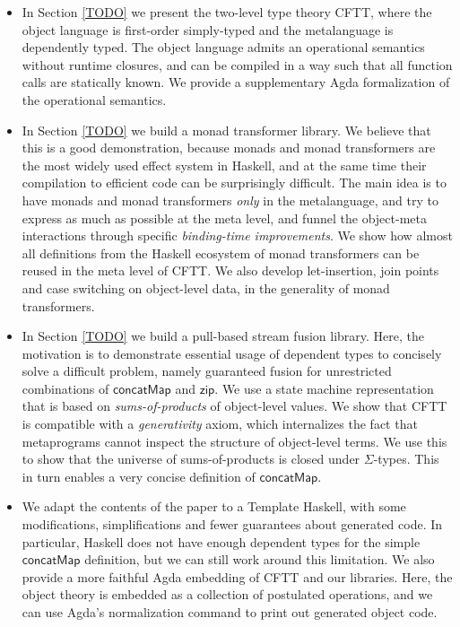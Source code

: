 \documentclass[acmsmall,screen,review,anonymous]{acmart}
\newcommand{\mit}[1]{{\mathsf{#1}}}
\newcommand{\msf}[1]{{\mathsf{#1}}}
\newcommand{\concatMap}{\msf{concatMap}}
\theoremstyle{remark}
\begin{document}
\begin{itemize}
\item In Section \ref{TODO} we present the two-level type theory CFTT, where the
  object language is first-order simply-typed and the metalanguage is
  dependently typed. The object language admits an operational semantics without
  runtime closures, and can be compiled in a way such that all function calls
  are statically known. We provide a supplementary Agda formalization of the
  operational semantics.
\item In Section \ref{TODO} we build a monad transformer library. We believe
  that this is a good demonstration, because monads and monad transformers are
  the most widely used effect system in Haskell, and at the same time their
  compilation to efficient code can be surprisingly difficult. The main idea is
  to have monads and monad transformers \emph{only} in the metalanguage, and try
  to express as much as possible at the meta level, and funnel the object-meta
  interactions through specific \emph{binding-time improvements}.  We show how
  almost all definitions from the Haskell ecosystem of monad transformers can be
  reused in the meta level of CFTT. We also develop let-insertion, join points
  and case switching on object-level data, in the generality of monad transformers.
\item In Section \ref{TODO} we build a pull-based stream fusion library. Here,
  the motivation is to demonstrate essential usage of dependent types to
  concisely solve a difficult problem, namely guaranteed fusion for unrestricted
  combinations of $\concatMap$ and $\mit{zip}$. We use a state machine
  representation that is based on \emph{sums-of-products} of object-level
  values. We show that CFTT is compatible with a \emph{generativity} axiom,
  which internalizes the fact that metaprograms cannot inspect the structure of
  object-level terms. We use this to show that the universe of sums-of-products
  is closed under $\Sigma$-types. This in turn enables a very
  concise definition of $\concatMap$.
\item
  We adapt the contents of the paper to a Template Haskell, with some
  modifications, simplifications and fewer guarantees about generated code.  In
  particular, Haskell does not have enough dependent types for the simple
  $\concatMap$ definition, but we can still work around this limitation. We also
  provide a more faithful Agda embedding of CFTT and our libraries. Here, the
  object theory is embedded as a collection of postulated operations, and we can
  use Agda's normalization command to print out generated object code.
\end{itemize}
\end{document}
